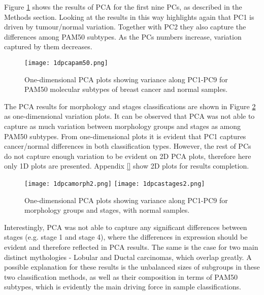     \newpage
    Figure \ref{fig:1dpcapam50} shows the results of PCA for the first nine PCs, as described in the Methods section. Looking at the results in this way highlights again that PC1 is driven by tumour/normal variation. Together with PC2 they also capture the differences among PAM50 subtypes. As the PCs numbers increase, variation captured by them decreases. 
    
            \begin{figure}[!h]
            \centering
            \texttt{[image: 1dpcapam50.png]}
            \caption{One-dimensional PCA plots showing variance along PC1-PC9 for PAM50 molecular subtypes of breast cancer and normal samples. }
            \label{fig:1dpcapam50}
            \end{figure}
    
    
    The PCA results for morphology and stages classifications are shown in Figure \ref{fig:1dpcamorphstage} as one-dimensional variation plots. It can be observed that PCA was not able to capture as much variation between morphology groups and stages as among PAM50 subtypes. From one-dimensional plots it is evident that PC1 captures cancer/normal differences in both classification types. However, the rest of PCs do not capture enough variation to be evident on 2D PCA plots, therefore here only 1D plots are presented. Appendix \ref{} show 2D plots for results completion.    
    
            
            \begin{figure}[!h]
            \texttt{[image: 1dpcamorph2.png]}\hfill
            \texttt{[image: 1dpcastages2.png]}
            \caption{One-dimensional PCA plots showing variance along PC1-PC9 for morphology groups and stages, with normal samples.}
            \label{fig:1dpcamorphstage}
            \end{figure}
            
    
    \newpage
    Interestingly, PCA was not able to capture any significant differences between stages (e.g. stage 1 and stage 4), where the differences in expression should be evident and therefore reflected in PCA results. The same is the case for two main distinct mythologies - Lobular and Ductal carcinomas, which overlap greatly. A possible explanation for these results is the unbalanced sizes of subgroups in these two classification methods, as well as their composition in terms of PAM50 subtypes, which is evidently the main driving force in sample classifications. 
    
